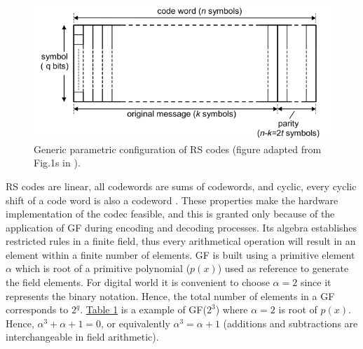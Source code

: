 \documentclass[conference]{IEEEtran}
\begin{document}
\begin{figure}[!hbt]
  \includegraphics[width=\linewidth]{figures/fig2.png}
  \caption{Generic parametric configuration of RS codes (figure adapted from Fig.1s in \cite{b8}).}
  \label{fig:fig2}
\end{figure}  

\par RS codes are linear, all codewords are sums of codewords, and cyclic, every cyclic shift of a code word is also a codeword \cite{b8}. These properties make the hardware implementation of the codec feasible, and this is granted only because of the application of GF during encoding and decoding processes. Its algebra establishes restricted rules in a finite field, thus every arithmetical operation will result in an element within a finite number of elements. GF is built using a primitive element $\alpha$ which is root of a primitive polynomial ($p(x)$) used as reference to generate the field elements. For digital world it is convenient to choose $\alpha = 2$ since it represents the binary notation. Hence, the total number of elements in a GF corresponds to $2^q$. \hyperref[tab:t1]{Table 1} is a example of GF($2^3$) where $\alpha = 2$ is root of $p(x)$. Hence, $\alpha^3 + \alpha + 1 = 0$, or equivalently $\alpha^3 =  \alpha + 1$ (additions and subtractions are interchangeable in field arithmetic).
\end{document}
